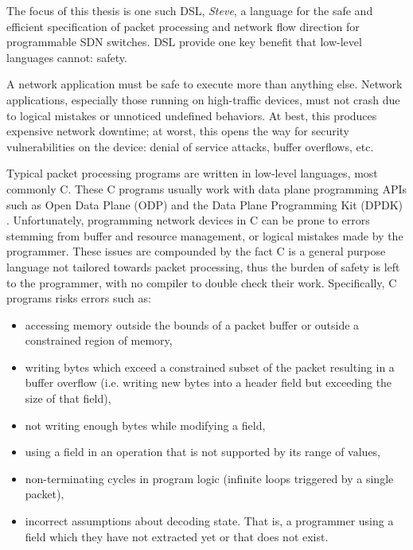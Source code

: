 The focus of this thesis is one such DSL, \emph{Steve}, a language for the safe
and
efficient specification of packet processing and network flow direction
for programmable SDN switches. DSL provide one key benefit that low-level
languages cannot: safety.

A network application must be safe to execute more than anything else.
Network applications, especially those running on high-traffic devices, must not
crash due to logical mistakes or unnoticed undefined behaviors.
At best, this produces expensive network downtime; at worst, this
opens the way for security vulnerabilities on the device:
denial of service attacks, buffer overflows, etc.

Typical packet processing programs are written in low-level languages, most
commonly C. These C programs usually work with data plane programming APIs such
as Open Data Plane (ODP) \cite{odp_webpage} and the Data Plane Programming Kit
(DPDK) \cite{dpdk_webpage}. Unfortunately, programming network devices in C can be prone
to errors stemming from buffer and resource management, or logical mistakes made by the programmer.
These issues are compounded by the fact C is a general
purpose language not tailored towards packet processing, thus the burden of
safety
is left to the programmer, with no compiler to double check their work.
Specifically, C programs risks errors such as:

\begin{itemize}
\item accessing memory outside the bounds of a packet buffer or outside a
constrained
region of memory,

\item writing bytes which exceed a constrained subset of the packet
resulting in a buffer overflow (i.e. writing new bytes into a header field
but exceeding the size of that field),

\item not writing enough bytes while modifying a field,

\item using a field in an operation that is not supported by its
range of values,

\item non-terminating cycles in program logic (infinite loops
triggered by a single packet),

\item incorrect assumptions about decoding state. That is, a programmer using
a field which they have not extracted yet or that does not exist.
\end{itemize}

